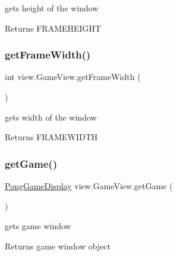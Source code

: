 gets height of the window 

\begin{DoxyReturn}{Returns}
F\+R\+A\+M\+E\+H\+E\+I\+G\+HT 
\end{DoxyReturn}
\hypertarget{classview_1_1_game_view_a729fea181bb79a2767e11f8c7be01711}{}\label{classview_1_1_game_view_a729fea181bb79a2767e11f8c7be01711} 
\subsubsection{\texorpdfstring{get\+Frame\+Width()}{getFrameWidth()}}
{\footnotesize\ttfamily int view.\+Game\+View.\+get\+Frame\+Width (\begin{DoxyParamCaption}{ }\end{DoxyParamCaption})}



gets width of the window 

\begin{DoxyReturn}{Returns}
F\+R\+A\+M\+E\+W\+I\+D\+TH 
\end{DoxyReturn}
\hypertarget{classview_1_1_game_view_ae5dd5521b47a1bdc57e2745ff3b11815}{}\label{classview_1_1_game_view_ae5dd5521b47a1bdc57e2745ff3b11815} 
\subsubsection{\texorpdfstring{get\+Game()}{getGame()}}
{\footnotesize\ttfamily \hyperlink{classview_1_1_pong_game_display}{Pong\+Game\+Display} view.\+Game\+View.\+get\+Game (\begin{DoxyParamCaption}{ }\end{DoxyParamCaption})}



gets game window 

\begin{DoxyReturn}{Returns}
game window object 
\end{DoxyReturn}
\hypertarget{classview_1_1_game_view_a35853d75ec07ee29d9257c1785508f02}{}\label{classview_1_1_game_view_a35853d75ec07ee29d9257c1785508f02} 

